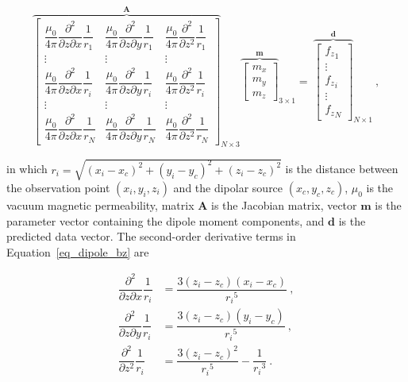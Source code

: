      \begin{equation}
    \label{eq_dipole_bz}
    {\overbrace{\begin{bmatrix}
    \dfrac{\mu_0}{4\pi} \dfrac{\partial^2}{\partial z \partial x} \dfrac{1}{r_1}
    & \dfrac{\mu_0}{4\pi} \dfrac{\partial^2}{\partial z \partial y} \dfrac{1}{r_1}
    & \dfrac{\mu_0}{4\pi} \dfrac{\partial^2}{\partial z^2} \dfrac{1}{r_1}
    \\
    \vdots & \vdots & \vdots
    \\
    \dfrac{\mu_0}{4\pi} \dfrac{\partial^2}{\partial z \partial x} \dfrac{1}{r_i}
    & \dfrac{\mu_0}{4\pi} \dfrac{\partial^2}{\partial z \partial y} \dfrac{1}{r_i}
    & \dfrac{\mu_0}{4\pi} \dfrac{\partial^2}{\partial z^2} \dfrac{1}{r_i}
    \\
    \vdots & \vdots & \vdots
    \\
    \dfrac{\mu_0}{4\pi} \dfrac{\partial^2}{\partial z \partial x} \dfrac{1}{r_N}
    & \dfrac{\mu_0}{4\pi} \dfrac{\partial^2}{\partial z \partial y} \dfrac{1}{r_N}
    & \dfrac{\mu_0}{4\pi} \dfrac{\partial^2}{\partial z^2} \dfrac{1}{r_N}
    \end{bmatrix}}^{\mathbf{A}}}_{N \times 3}
    {\overbrace{{\begin{bmatrix}
    m_x \\ m_y \\ m_z
    \end{bmatrix}}}^{\mathbf{m}}}_{3 \times 1}
    =
    ~{\overbrace{\begin{bmatrix}
    {f_z}_1
    \\
    \vdots
    \\
    {f_z}_i
    \\
    \vdots
    \\
    {f_z}_N
    \end{bmatrix}}^{\mathbf{d}}}_{N \times 1}
    \ ,
    \end{equation}

    \noindent
    in which $r_i = \sqrt{(x_i - x_c)^2 + (y_i - y_c)^2 + (z_i - z_c)^2}$ is the distance between the observation point $(x_i, y_i, z_i)$ and the dipolar source $(x_c, y_c, z_c)$, $\mu_0$ is the vacuum magnetic permeability, matrix $\mathbf{A}$ is the Jacobian matrix, vector $\mathbf{m}$ is the parameter vector containing the dipole moment components, and $\mathbf{d}$ is the predicted data vector. The second-order derivative terms in Equation~\ref{eq_dipole_bz} are

    \begin{equation}
    \begin{aligned}
    \dfrac{\partial^2}{\partial z \partial x} \dfrac{1}{r_i} &=
    \dfrac{3(z_i - z_c)(x_i - x_c)}{{r_i}^5}\ ,
    \\
    \dfrac{\partial^2}{\partial z \partial y} \dfrac{1}{r_i} &=
    \dfrac{3(z_i - z_c)(y_i - y_c)}{{r_i}^5}\ ,
    \\
    \dfrac{\partial^2}{\partial z^2} \dfrac{1}{r_i} &=
    \dfrac{3(z_i - z_c)^2}{{r_i}^5} - \dfrac{1}{{r_i}^3}\ .
    \end{aligned}
    \end{equation}

